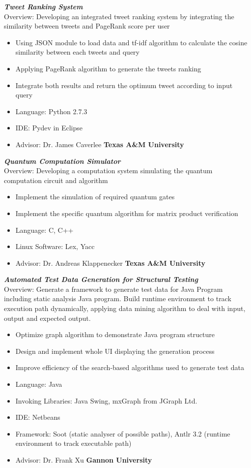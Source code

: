 \documentclass[margin]{res}
\begin{document}
\begin{resume}
	{\sl \textbf{Tweet Ranking System}}\\
		Overview: Developing an integrated tweet ranking system by integrating the similarity between tweets and PageRank score per user
		\begin{itemize}
			\item Using JSON module to load data and tf-idf algorithm to calculate the cosine similarity between each tweets and query
			\item Applying PageRank algorithm to generate the tweets ranking
			\item Integrate both results and return the optimum tweet according to input query
			\item Language: Python 2.7.3
			\item IDE: Pydev in Eclipse
			\item Advisor: Dr. James Caverlee \hfill \textbf{Texas A\&M University}
		\end {itemize}
		
	{\sl \textbf{Quantum Computation Simulator}}\\
		Overview: Developing a computation system simulating the quantum computation circuit and algorithm 
		\begin{itemize}
			\item Implement the simulation of required quantum gates
			\item Implement the specific quantum algorithm for matrix product verification
			\item Language: C, C++
			\item Linux Software: Lex, Yacc
			\item Advisor: Dr. Andreas Klappenecker \hfill \textbf{Texas A\&M University}
		\end {itemize}
                

	{\sl \textbf{Automated Test Data Generation for Structural Testing}}\\
		Overview: Generate a framework to generate test data for Java Program including static analysis Java program. Build runtime environment to track execution path dynamically, applying data mining algorithm to deal with input, output and expected output.
		\begin{itemize}
			\item Optimize graph algorithm to demonstrate Java program structure
			\item Design and implement whole UI displaying the generation process
			\item Improve efficiency of the search-based algorithms used to generate test data
			\item Language: Java
			\item Invoking Libraries: Java Swing, mxGraph from JGraph Ltd.
			\item IDE: Netbeans
			\item Framework: Soot (static analyser of possible paths), Antlr 3.2 (runtime environment to track executable path)
			\item Advisor: Dr. Frank Xu \hfill \textbf{Gannon University} 
		\end {itemize}


\end{resume}
\end{document}
